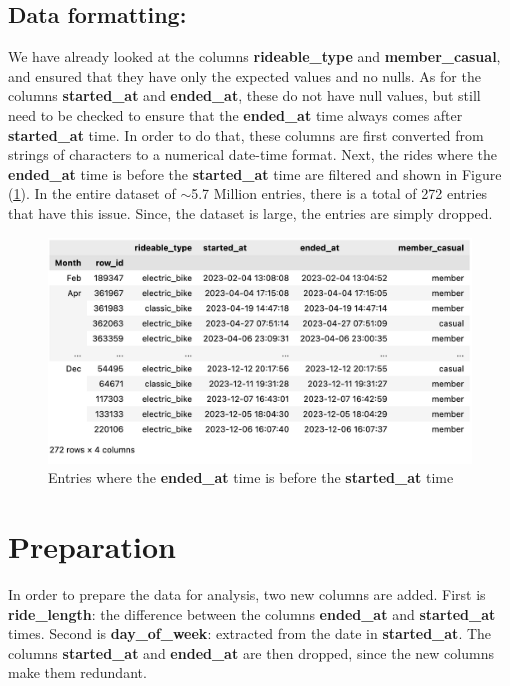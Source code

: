 \documentclass[12pt]{article}
\begin{document}
\subsection{Data formatting:}
We have already looked at the columns \textbf{rideable\_type} and \textbf{member\_casual}, and ensured that they have only the expected values and no nulls. As for the columns \textbf{started\_at} and \textbf{ended\_at}, these do not have null values, but still need to be checked to ensure that the \textbf{ended\_at} time always comes after \textbf{started\_at} time. In order to do that, these columns are first converted from strings of characters to a numerical date-time format. Next, the rides where the \textbf{ended\_at} time is before the \textbf{started\_at} time are filtered and shown in Figure (\underline{\ref{fig8}}). In the entire dataset of $\sim$5.7 Million entries, there is a total of 272 entries that have this issue. Since, the dataset is large, the entries are simply dropped. \\

	\begin{figure}[h]
	\centering
	\includegraphics[scale=0.6]{same_started_at.png}
	\caption{Entries where the \textbf{ended\_at} time is before the \textbf{started\_at} time}
	\label{fig8}
	\end{figure}
	
	
\section{Preparation}
In order to prepare the data for analysis, two new columns are added. First is \textbf{ride\_length}: the difference between the columns \textbf{ended\_at} and \textbf{started\_at} times. Second is \textbf{day\_of\_week}: extracted from the date in \textbf{started\_at}. The columns \textbf{started\_at} and \textbf{ended\_at} are then dropped, since the new columns make them redundant.
	
\end{document}
